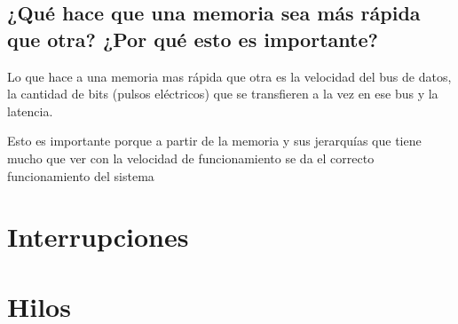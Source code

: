 \documentclass{article}
\begin{document}
\subsection{¿Qué hace que una memoria sea más rápida que otra?
¿Por qué esto es importante?}

\vspace{0.5cm}
\noindent
Lo que hace a una memoria mas rápida que otra es la velocidad del bus de datos, la cantidad de bits (pulsos eléctricos) que se transfieren a la vez en ese bus y la latencia.

\vspace{0.5cm}
\noindent
Esto es importante porque a partir de la memoria y sus jerarquías que tiene mucho que ver con la velocidad de funcionamiento se da el correcto funcionamiento del sistema

\newpage
\section{Interrupciones} \label{contenido}
\newpage
\section{Hilos} \label{contenido}
\end{document}
